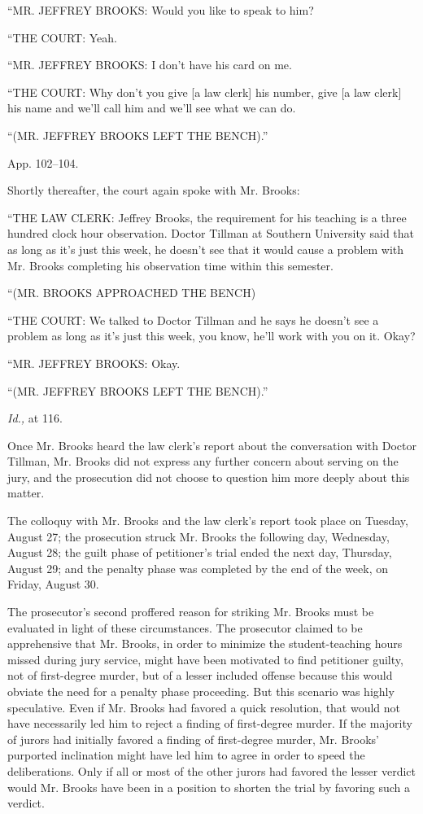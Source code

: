 {      \newpage  ``MR. JEFFREY BROOKS: Would you like to speak to him?

      ``THE COURT: Yeah.

      ``MR. JEFFREY BROOKS: I don't have his card on me.

      ``THE COURT: Why don't you give [a law clerk] his number, give
    [a law clerk] his name and we'll call him and we'll see what we
    can do.

      ``(MR. JEFFREY BROOKS LEFT THE BENCH).''

    App. 102--104.

  Shortly thereafter, the court again spoke with Mr. Brooks:

      ``THE LAW CLERK: Jeffrey Brooks, the requirement for his teaching
    is a three hundred clock hour observation. Doctor Tillman at
    Southern University said that as long as it's just this week,
    he doesn't see that it would cause a problem with Mr. Brooks
    completing his observation time within this semester.

      ``(MR. BROOKS APPROACHED THE BENCH)

      ``THE COURT: We talked to Doctor Tillman and he says he doesn't
    see a problem as long as it's just this week, you know, he'll
    work with you on it. Okay?

      ``MR. JEFFREY BROOKS: Okay.

      ``(MR. JEFFREY BROOKS LEFT THE BENCH).''

    \emph{Id.,} at 116.

  Once Mr. Brooks heard the law clerk's report about the conversation
with Doctor Tillman, Mr. Brooks did not express any further concern
about serving on the jury, and the prosecution did not choose to
question him more deeply about this matter.

  The colloquy with Mr. Brooks and the law clerk's report took place
on Tuesday, August 27; the prosecution struck Mr. Brooks the following
day, Wednesday, August 28; the guilt phase of petitioner's trial ended
the next day, Thursday, August 29; and the penalty phase was completed
by the end of the week, on Friday, August 30.\newpage 

  The prosecutor's second proffered reason for striking Mr. Brooks
must be evaluated in light of these circumstances. The prosecutor
claimed to be apprehensive that Mr. Brooks, in order to minimize the
student-teaching hours missed during jury service, might have been
motivated to find petitioner guilty, not of first-degree murder, but
of a lesser included offense because this would obviate the need for
a penalty phase proceeding. But this scenario was highly speculative.
Even if Mr. Brooks had favored a quick resolution, that would not have
necessarily led him to reject a finding of first-degree murder. If the
majority of jurors had initially favored a finding of first-degree
murder, Mr. Brooks' purported inclination might have led him to agree
in order to speed the deliberations. Only if all or most of the other
jurors had favored the lesser verdict would Mr. Brooks have been in a
position to shorten the trial by favoring such a verdict.

}
